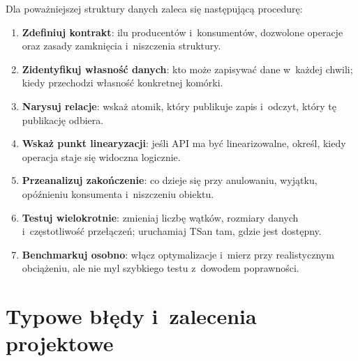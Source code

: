 Dla poważniejszej struktury danych zaleca się następującą procedurę:
\begin{enumerate}
\item \textbf{Zdefiniuj kontrakt}: ilu producentów i~konsumentów,
      dozwolone operacje oraz zasady zamknięcia i~niszczenia struktury.
\item \textbf{Zidentyfikuj własność danych}: kto może zapisywać dane
      w~każdej chwili; kiedy przechodzi własność konkretnej komórki.
\item \textbf{Narysuj relacje}: wskaż atomik, który publikuje zapis
      i~odczyt, który tę publikację odbiera.
\item \textbf{Wskaż punkt linearyzacji}: jeśli API ma być linearizowalne,
      określ, kiedy operacja staje się widoczna logicznie.
\item \textbf{Przeanalizuj zakończenie}: co dzieje się przy anulowaniu,
      wyjątku, opóźnieniu konsumenta i~niszczeniu obiektu.
\item \textbf{Testuj wielokrotnie}: zmieniaj liczbę wątków, rozmiary
      danych i~częstotliwość przełączeń; uruchamiaj TSan tam,
      gdzie jest dostępny.
\item \textbf{Benchmarkuj osobno}: włącz optymalizacje i~mierz
      przy realistycznym obciążeniu, ale nie myl szybkiego testu
      z~dowodem poprawności.
\end{enumerate}

\section{Typowe błędy i~zalecenia projektowe}
\label{sec:cpp16-guidelines}

